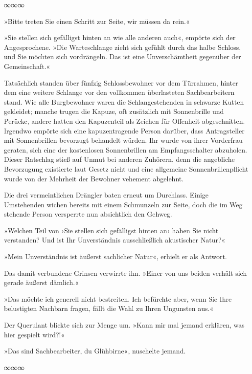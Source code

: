 \begin{center}
	∞∞∞
\end{center}

»Bitte treten Sie einen Schritt zur Seite, wir müssen da rein.«

»Sie stellen sich gefälligst hinten an wie alle anderen auch«, empörte sich der Angesprochene. »Die Warteschlange zieht sich gefühlt durch das halbe Schloss, und Sie möchten sich vordrängeln. Das ist eine Unverschämtheit gegenüber der Gemeinschaft.«

Tatsächlich standen über fünfzig Schlossbewohner vor dem Türrahmen, hinter dem eine weitere Schlange vor den vollkommen überlasteten Sachbearbeitern stand. Wie alle Burgbewohner waren die Schlangestehenden in schwarze Kutten gekleidet; manche trugen die Kapuze, oft zusätzlich mit Sonnenbrille und Perücke, andere hatten den Kapuzenteil als Zeichen für Offenheit abgeschnitten. Irgendwo empörte sich eine kapuzentragende Person darüber, dass Antragsteller mit Sonnenbrillen bevorzugt behandelt würden. Ihr wurde von ihrer Vorderfrau geraten, sich eine der kostenlosen Sonnenbrillen am Empfangsschalter abzuholen. Dieser Ratschlag stieß auf Unmut bei anderen Zuhörern, denn die angebliche Bevorzugung existierte laut Gesetz nicht und eine allgemeine Sonnenbrillenpflicht wurde von der Mehrheit der Bewohner vehement abgelehnt.

Die drei vermeintlichen Drängler baten erneut um Durchlass. Einige Umstehenden wichen bereits mit einem Schmunzeln zur Seite, doch die im Weg stehende Person versperrte nun absichtlich den Gehweg.

»Welchen Teil von ›Sie stellen sich gefälligst hinten an‹ haben Sie nicht verstanden? Und ist Ihr Unverständnis ausschließlich akustischer Natur?«

»Mein Unverständnis ist äußerst sachlicher Natur«, erhielt er als Antwort.

Das damit verbundene Grinsen verwirrte ihn. »Einer von uns beiden verhält sich gerade äußerst dämlich.«

»Das möchte ich generell nicht bestreiten. Ich befürchte aber, wenn Sie Ihre belustigten Nachbarn fragen, fällt die Wahl zu Ihren Ungunsten aus.«

Der Querulant blickte sich zur Menge um. »Kann mir mal jemand erklären, was hier gespielt wird?!«

»Das sind Sachbearbeiter, du Glühbirne«, nuschelte jemand.

\begin{center}
	∞∞∞
\end{center}

